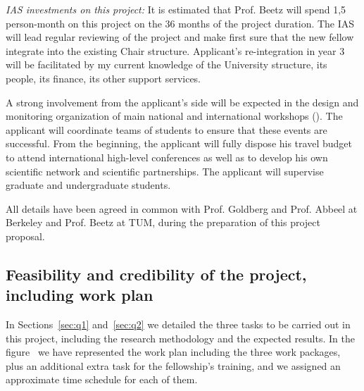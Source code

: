 \emph{IAS investments on this project:}
It is estimated  that Prof. Beetz will spend  1,5 person-month on this
project on the 36 months of  the project duration. The IAS will lead
regular  reviewing of the  project and  make first  sure that  the new
fellow integrate into the existing Chair structure. Applicant's re-integration
in  year  3  will  be  facilitated  by my  current  knowledge  of  the
University  structure,  its people,  its  finance,  its other  support
services.


A strong involvement from the applicant's side will be expected in the design
and  monitoring  organization   of  main  national  and  international
workshops  (). The applicant  will  coordinate  teams of
students  to  ensure  that  these  events are  successful.   From  the
beginning,  the applicant will fully  dispose his  travel budget  to attend
international  high-level conferences  as well  as to  develop  his own
scientific  network  and scientific  partnerships.   The applicant will  supervise
graduate and undergraduate students.

All details  have been agreed in  common with Prof. Goldberg and Prof. Abbeel  
at Berkeley and Prof. Beetz at TUM, during the preparation of this project proposal.


\subsection{Feasibility and credibility of the project, including work plan} 
In Sections~\ref{sec:q1} and~\ref{sec:q2} we detailed the three tasks to be carried 
out in this project, including the research methodology and the expected results. 
In the figure~ we have represented the work plan including the three 
work packages, plus an additional extra task for the fellowship's training, and we assigned 
an approximate time schedule for each of them. \\
\\
